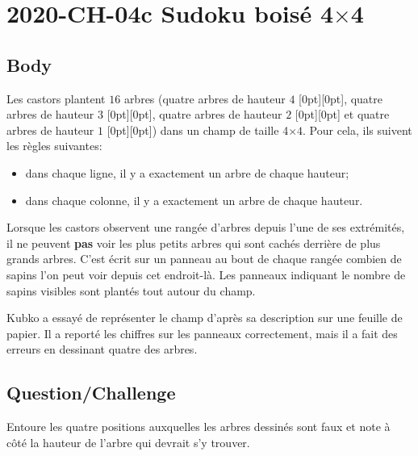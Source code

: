 \documentclass[a4paper,11pt]{report}
\newcommand{\taskGraphicsFolder}{..}
\begin{document}
\section*{\centering{} 2020-CH-04c Sudoku boisé 4\ensuremath{\times}4}


\subsection*{Body}

Les castors plantent $16$ arbres (quatre arbres de hauteur $4$ \raisebox{-0.5ex}[0pt][0pt]{}, quatre arbres de hauteur $3$ \raisebox{-0.5ex}[0pt][0pt]{}, quatre arbres de hauteur $2$ \raisebox{-0.5ex}[0pt][0pt]{} et quatre arbres de hauteur $1$ \raisebox{-0.5ex}[0pt][0pt]{}) dans un champ de taille 4\ensuremath{\times}$4$. Pour cela, ils suivent les règles suivantes:

\begin{itemize}
  \item dans chaque ligne, il y a exactement un arbre de chaque hauteur;
  \item dans chaque colonne, il y a exactement un arbre de chaque hauteur.
\end{itemize}

{\centering%
\par}

Lorsque les castors observent une rangée d’arbres depuis l’une de ses extrémités, il ne peuvent \textbf{pas} voir les plus petits arbres qui sont cachés derrière de plus grands arbres. C’est écrit sur un panneau au bout de chaque rangée combien de sapins l’on peut voir depuis cet endroit-là. Les panneaux indiquant le nombre de sapins visibles sont plantés tout autour du champ.

Kubko a essayé de représenter le champ d’après sa description sur une feuille de papier. Il a reporté les chiffres sur les panneaux correctement, mais il a fait des erreurs en dessinant quatre des arbres.

{\em

\subsection*{Question/Challenge}

Entoure les quatre positions auxquelles les arbres dessinés sont faux et note à côté la hauteur de l’arbre qui devrait s’y trouver.

{\centering%
\par}

}\begingroup
\renewcommand{\arraystretch}{1.5}
\end{document}
